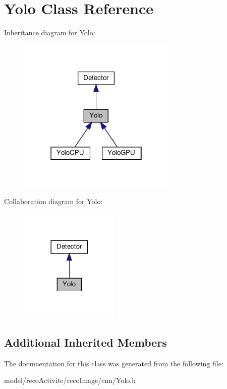 \section{Yolo Class Reference}
\label{class_yolo}


Inheritance diagram for Yolo\+:
\nopagebreak
\begin{figure}[H]
\begin{center}
\leavevmode
\includegraphics[width=214pt]{class_yolo__inherit__graph}
\end{center}
\end{figure}


Collaboration diagram for Yolo\+:
\nopagebreak
\begin{figure}[H]
\begin{center}
\leavevmode
\includegraphics[width=134pt]{class_yolo__coll__graph}
\end{center}
\end{figure}
\subsection*{Additional Inherited Members}


The documentation for this class was generated from the following file\+:\begin{DoxyCompactItemize}
\item 
model/reco\+Activite/reco\+Image/cnn/Yolo.\+h\end{DoxyCompactItemize}

